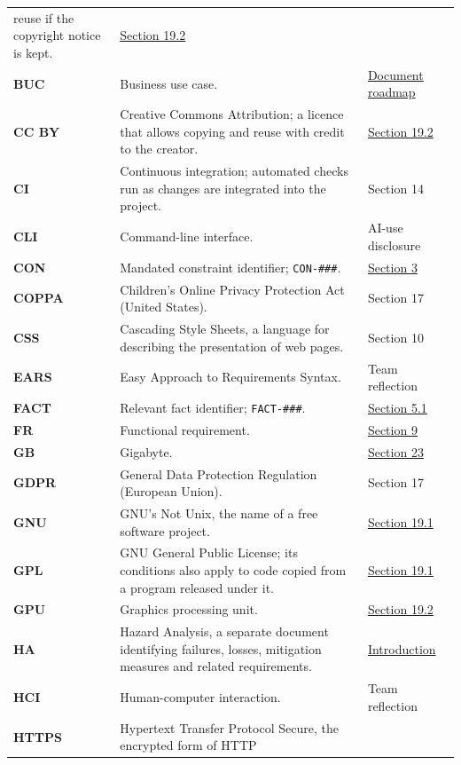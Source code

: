 \documentclass[12pt]{article}
\renewcommand{\_}{\textunderscore\allowbreak}%
\begin{document}
{\begin{longtable}{@{}>{\raggedright\arraybackslash}p{}>{\raggedright\arraybackslash}p{}>{\raggedright\arraybackslash}p{}@{}}
reuse if the copyright notice is kept. & \hyperref[sec:ots-components]{Section
19.2}\\
\textbf{BUC} & Business use case. & \hyperref[sec:purpose]{Document roadmap}\\
\textbf{CC BY} & Creative Commons Attribution; a licence that allows copying and
reuse with credit to the creator. & \hyperref[sec:ots-components]{Section
19.2}\\
\textbf{CI} & Continuous integration; automated checks run as changes are
integrated into the project. & Section 14\\
\textbf{CLI} & Command-line interface. & AI-use disclosure\\
\textbf{CON} & Mandated constraint identifier; \texttt{CON-\#\#\#}. &
\hyperref[sec:constraints]{Section 3}\\
\textbf{COPPA} & Children's Online Privacy Protection Act (United States). &
Section 17\\
\textbf{CSS} & Cascading Style Sheets, a language for describing the
presentation of web pages. & Section 10\\
\textbf{EARS} & Easy Approach to Requirements Syntax. & Team reflection\\
\textbf{FACT} & Relevant fact identifier; \texttt{FACT-\#\#\#}. &
\hyperref[sec:facts]{Section 5.1}\\
\textbf{FR} & Functional requirement. & \hyperref[sec:functional]{Section 9}\\
\textbf{GB} & Gigabyte. & \hyperref[sec:costs]{Section 23}\\
\textbf{GDPR} & General Data Protection Regulation (European Union). & Section
17\\
\textbf{GNU} & GNU's Not Unix, the name of a free software project. &
\hyperref[sec:ots-products]{Section 19.1}\\
\textbf{GPL} & GNU General Public License; its conditions also apply to code
copied from a program released under it. & \hyperref[sec:ots-products]{Section
19.1}\\
\textbf{GPU} & Graphics processing unit. & \hyperref[sec:ots-components]{Section
19.2}\\
\textbf{HA} & Hazard Analysis, a separate document identifying failures, losses,
mitigation measures and related requirements. &
\hyperref[sec:introduction]{Introduction}\\
\textbf{HCI} & Human-computer interaction. & Team reflection\\
\textbf{HTTPS} & Hypertext Transfer Protocol Secure, the encrypted form of HTTP

\end{longtable}}
\end{document}
